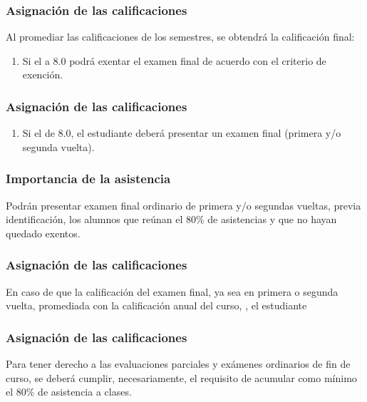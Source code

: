 \documentclass[14pt]{beamer}
\begin{document}
\begin{frame}
\frametitle{Asignación de las calificaciones}
Al promediar las calificaciones de los semestres, se obtendrá la calificación final:
\begin{enumerate}[<+->]
\item Si el  a $8.0$ podrá exentar el examen final de acuerdo con el criterio de exención.
\seti
\end{enumerate}
\end{frame}
\begin{frame}
\frametitle{Asignación de las calificaciones}
\begin{enumerate}[<+->]
\conti
\item Si el  de 8.0, el estudiante deberá presentar un examen final (primera y/o segunda vuelta).
\end{enumerate}
\end{frame}
\begin{frame}
\frametitle{Importancia de la asistencia}
Podrán presentar examen final ordinario de primera y/o segundas vueltas, previa identificación, los alumnos que reúnan el $80\%$ de asistencias y que no hayan quedado exentos.
\end{frame}
\begin{frame}
\frametitle{Asignación de las calificaciones}    
En caso de que la calificación del examen final, ya sea en primera o segunda vuelta, promediada con la calificación anual del curso, , \pause el estudiante 
\end{frame}
\begin{frame}
\frametitle{Asignación de las calificaciones}
Para tener derecho a las evaluaciones parciales y exámenes ordinarios de fin de curso, se deberá cumplir, necesariamente, el requisito de acumular como mínimo el $80\%$ de asistencia a clases.
\end{frame}
\end{document}
